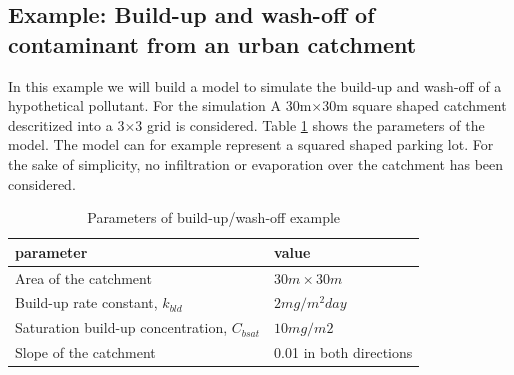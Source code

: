 \subsection{Example: Build-up and wash-off of contaminant from an urban catchment}

In this example we will build a model to simulate the build-up and wash-off of a hypothetical pollutant. For the simulation A 30m$\times$30m square shaped catchment descritized into a 3$\times$3 grid is considered. Table \ref{table:Build-up} shows the parameters of the model. The model can for example represent a squared shaped parking lot. For the sake of simplicity, no infiltration or evaporation over the catchment has been considered.  

\begin{table}
\caption{Parameters of build-up/wash-off example}
\begin{tabular}{l l}\label{table:Build-up}
parameter & value \\
\hline
Area of the catchment & $30m\times 30m$ \\
Build-up rate constant, $k_{bld}$ & $2mg/m^2 day$ \\
Saturation build-up concentration, $C_{bsat}$ & $10mg/m2$ \\
Slope of the catchment & 0.01 in both directions \\
\end{tabular}\\
\end{table}

